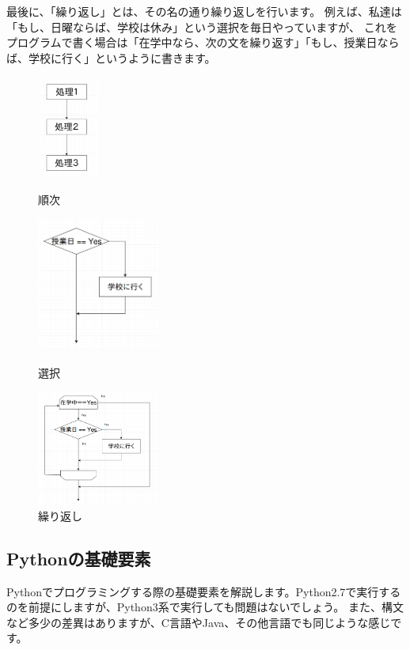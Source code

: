 \documentclass[11pt,a4paper]{jsarticle}
\begin{document}
最後に、「繰り返し」とは、その名の通り繰り返しを行います。
例えば、私達は「もし、日曜ならば、学校は休み」という選択を毎日やっていますが、
これをプログラムで書く場合は「在学中なら、次の文を繰り返す」「もし、授業日ならば、学校に行く」というように書きます。
\begin{figure}[htbp]
 \begin{minipage}{0.3\hsize}
  \begin{center}
   \includegraphics[width=20mm]{./sequential.png}
  \end{center}
  \caption{順次}
 \end{minipage}
 \begin{minipage}{0.3\hsize}
 \begin{center}
  \includegraphics[width=40mm]{./choose.png}
 \end{center}
  \caption{選択}
 \end{minipage}
 \begin{minipage}{0.3\hsize}
 \begin{center}
  \includegraphics[width=40mm]{./repetition.png}
 \end{center}
  \caption{繰り返し}
 \end{minipage}
\end{figure}


\subsection{Pythonの基礎要素}
Pythonでプログラミングする際の基礎要素を解説します。Python2.7で実行するのを前提にしますが、Python3系で実行しても問題はないでしょう。
また、構文など多少の差異はありますが、C言語やJava、その他言語でも同じような感じです。
\end{document}
